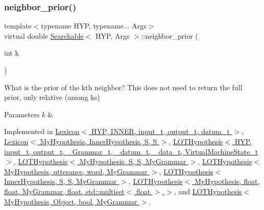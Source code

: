 \subsubsection{\texorpdfstring{neighbor\+\_\+prior()}{neighbor\_prior()}}
{\footnotesize\ttfamily template$<$typename H\+YP, typename... Args$>$ \\
virtual double \hyperlink{class_searchable}{Searchable}$<$ H\+YP, Args $>$\+::neighbor\+\_\+prior (\begin{DoxyParamCaption}\item[{int}]{k }\end{DoxyParamCaption})\hspace{0.3cm}{\ttfamily [pure virtual]}}



What is the prior of the k\textquotesingle{}th neighbor? This does not need to return the full prior, only relative (among ks) 


\begin{DoxyParams}{Parameters}
{\em k} & \\
\hline
\end{DoxyParams}


Implemented in \hyperlink{class_lexicon_ad237c78e3435223f344d153da3baba9b}{Lexicon$<$ H\+Y\+P, I\+N\+N\+E\+R, input\+\_\+t, output\+\_\+t, datum\+\_\+t $>$}, \hyperlink{class_lexicon_ad237c78e3435223f344d153da3baba9b}{Lexicon$<$ My\+Hypothesis, Inner\+Hypothesis, S, S $>$}, \hyperlink{class_l_o_t_hypothesis_a34fb9e13bc6855d6599c1c3e62d88933}{L\+O\+T\+Hypothesis$<$ H\+Y\+P, input\+\_\+t, output\+\_\+t, \+\_\+\+Grammar\+\_\+t, \+\_\+datum\+\_\+t, \+\_\+data\+\_\+t, Virtual\+Machine\+State\+\_\+t $>$}, \hyperlink{class_l_o_t_hypothesis_a34fb9e13bc6855d6599c1c3e62d88933}{L\+O\+T\+Hypothesis$<$ My\+Hypothesis, S, S, My\+Grammar $>$}, \hyperlink{class_l_o_t_hypothesis_a34fb9e13bc6855d6599c1c3e62d88933}{L\+O\+T\+Hypothesis$<$ My\+Hypothesis, utterance, word, My\+Grammar $>$}, \hyperlink{class_l_o_t_hypothesis_a34fb9e13bc6855d6599c1c3e62d88933}{L\+O\+T\+Hypothesis$<$ Inner\+Hypothesis, S, S, My\+Grammar $>$}, \hyperlink{class_l_o_t_hypothesis_a34fb9e13bc6855d6599c1c3e62d88933}{L\+O\+T\+Hypothesis$<$ My\+Hypothesis, float, float, My\+Grammar, float, std\+::multiset$<$ float $>$ $>$}, and \hyperlink{class_l_o_t_hypothesis_a34fb9e13bc6855d6599c1c3e62d88933}{L\+O\+T\+Hypothesis$<$ My\+Hypothesis, Object, bool, My\+Grammar $>$}.

\mbox{\label{class_searchable_aec30063fcc9bed5d005f8318efa8492d}} 
